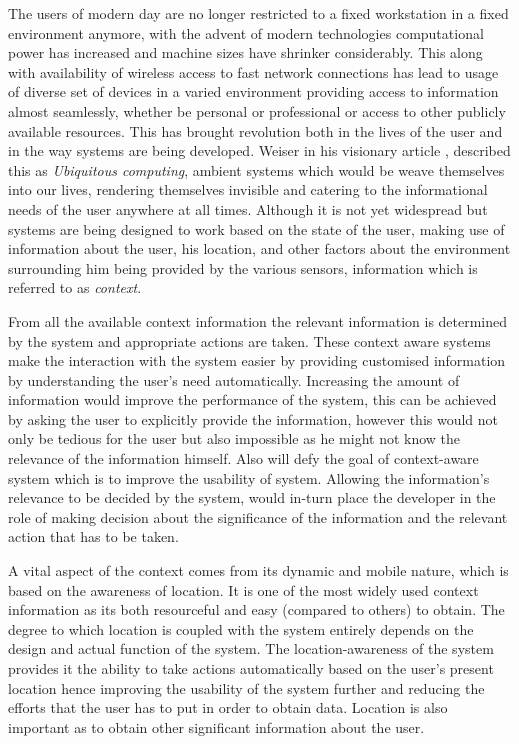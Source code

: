 \documentclass[12pt]{report}
\begin{document}
The users of modern day are no longer restricted to a fixed workstation in a fixed environment anymore, with the advent of modern technologies computational power has increased and machine sizes have shrinker considerably. This along with availability of wireless access to fast network connections has lead to usage of diverse set of devices in a varied environment providing access to information almost seamlessly, whether be personal or professional or access to other publicly available resources. This has brought revolution both in the lives of the user and in the way systems are being developed. Weiser in his visionary article \cite{weiser1991computer}, described this as \textit{Ubiquitous computing}, ambient systems which would be weave themselves into our lives, rendering themselves invisible and catering to the informational needs of the user anywhere at all times. Although it is not yet widespread but systems are being designed to work based on the state of the user, making use of information about the user, his location, and other factors about the environment surrounding him being provided by the various sensors, information which is referred to as \textit{context}.


From all the available context information the relevant information is determined by the system and appropriate actions are taken. These context aware systems make the interaction with the system easier by providing customised information by understanding the user's need automatically. Increasing the amount of information would improve the performance of the system, this can be achieved by asking the user to explicitly provide the information, however this would not only be tedious for the user but also impossible as he might not know the relevance of the information himself. Also will defy the goal of context-aware system which is to improve the usability of system. Allowing the information's relevance to be decided by the system, would in-turn place the developer in the role of making decision about the significance of the information and the relevant action that has to be taken.

A vital aspect of the context comes from its dynamic and mobile nature, which is based on the awareness of location. It is one of the most widely used context information as its both resourceful and easy (compared to others) to obtain. The degree to which location is coupled with the system entirely depends on the design and actual function of the system. The location-awareness of the system provides it the ability to take actions automatically based on the user's present location hence improving the usability of the system further and reducing the efforts that the user has to put in order to obtain data. Location is also important as to obtain other significant information about the user.
\end{document}
